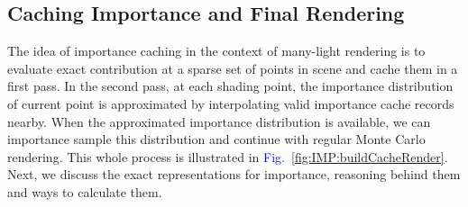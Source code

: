\documentclass[]{book}
\renewcommand{\figurename}{\textcolor{blue}{Fig.\ }}
\begin{document}
\subsection{Caching Importance and Final Rendering}
\label{sec:imp_cache:algorithm:cacheRender}
The idea of importance caching in the context of many-light rendering is to evaluate exact contribution at a sparse set of points in scene and cache them in a first pass.
In the second pass, at each shading point, the importance distribution of current point is approximated by interpolating valid importance cache records nearby.
When the approximated importance distribution is available, we can importance sample this distribution and continue with regular Monte Carlo rendering.
This whole process is illustrated in \figurename \ref{fig:IMP:buildCacheRender}.
Next, we discuss the exact representations for importance, reasoning behind them and ways to calculate them.
\end{document}
